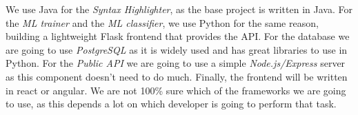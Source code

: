 \documentclass[11pt]{article}
\begin{document}
We use Java for the \textit{Syntax Highlighter}, as the base project is written in Java. For the \textit{ML trainer} and the \textit{ML classifier}, we use Python for the same reason, building a lightweight Flask frontend that provides the API. For the database we are going to use \textit{PostgreSQL} as it is widely used and has great libraries to use in Python. For the \textit{Public API} we are going to use a simple \textit{Node.js/Express} server as this component doesn't need to do much. Finally, the frontend will be written in react or angular. We are not 100\% sure which of the frameworks we are going to use, as this depends a lot on which developer is going to perform that task.
\end{document}
